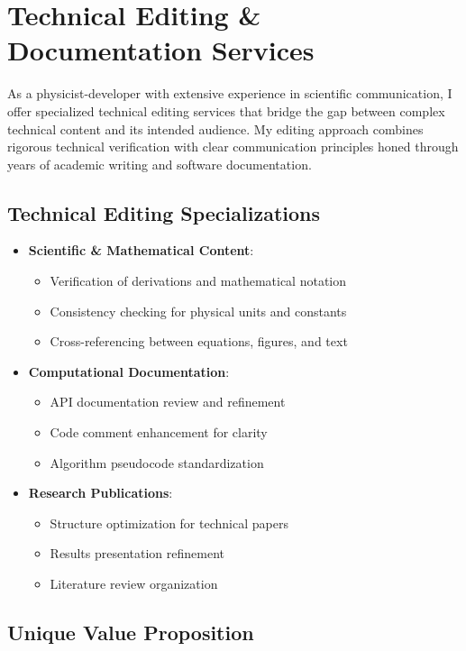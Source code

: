 \documentclass[11pt]{article}
\begin{document}
\section*{Technical Editing \& Documentation Services}

As a physicist-developer with extensive experience in scientific communication, I offer specialized technical editing services that bridge the gap between complex technical content and its intended audience. My editing approach combines rigorous technical verification with clear communication principles honed through years of academic writing and software documentation.

\subsection*{Technical Editing Specializations}

\begin{itemize}
\item \textbf{Scientific \& Mathematical Content}:
  \begin{itemize}
  \item Verification of derivations and mathematical notation
  \item Consistency checking for physical units and constants
  \item Cross-referencing between equations, figures, and text
  \end{itemize}

\item \textbf{Computational Documentation}:
  \begin{itemize}
  \item API documentation review and refinement
  \item Code comment enhancement for clarity
  \item Algorithm pseudocode standardization
  \end{itemize}

\item \textbf{Research Publications}:
  \begin{itemize}
  \item Structure optimization for technical papers
  \item Results presentation refinement
  \item Literature review organization
  \end{itemize}
\end{itemize}

\subsection*{Unique Value Proposition}
\end{document}
